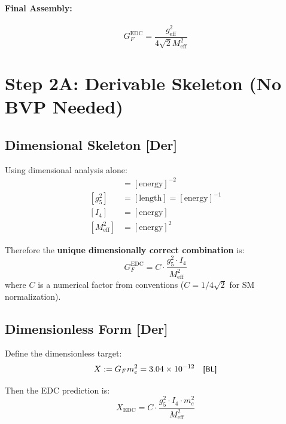 \documentclass[11pt]{article}
\newcommand{\tagDer}{{\small\textsf{[Der]}}}
\newcommand{\tagBL}{{\small\textsf{[BL]}}}
\begin{document}
\paragraph{Final Assembly:}
\begin{equation}
    \boxed{G_F^{\text{EDC}} = \frac{g_{\text{eff}}^2}{4\sqrt{2} M_{\text{eff}}^2}}
    \label{eq:GF_EDC}
\end{equation}

\section{Step 2A: Derivable Skeleton (No BVP Needed)}

\subsection{Dimensional Skeleton \tagDer{}}

Using dimensional analysis alone:
\begin{align}
    [G_F] &= [\text{energy}]^{-2} \\
    [g_5^2] &= [\text{length}] = [\text{energy}]^{-1} \\
    [I_4] &= [\text{energy}] \\
    [M_{\text{eff}}^2] &= [\text{energy}]^2
\end{align}

Therefore the \textbf{unique dimensionally correct combination} is:
\begin{equation}
    \boxed{G_F^{\text{EDC}} = C \cdot \frac{g_5^2 \cdot I_4}{M_{\text{eff}}^2}}
    \label{eq:GF_skeleton}
\end{equation}
where $C$ is a numerical factor from conventions ($C = 1/4\sqrt{2}$ for SM normalization).

\subsection{Dimensionless Form \tagDer{}}

Define the dimensionless target:
\begin{equation}
    X := G_F m_e^2 = 3.04 \times 10^{-12} \quad \tagBL{}
\end{equation}

Then the EDC prediction is:
\begin{equation}
    \boxed{X_{\text{EDC}} = C \cdot \frac{g_5^2 \cdot I_4 \cdot m_e^2}{M_{\text{eff}}^2}}
    \label{eq:X_EDC}
\end{equation}
\end{document}
